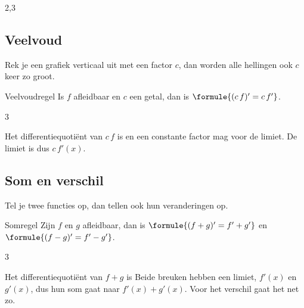 \begin{alleenvoor}{2,3}
\subsection{Veelvoud}

Rek je een grafiek verticaal uit met een factor $c$, dan worden alle hellingen ook $c$ keer zo groot.

\begin{theorie}
\begin{stelling}{Veelvoudregel}
Is $f$ afleidbaar en $c$ een getal, dan is \quad $\formule{(c\,f)' = c\,f'}$.
\end{stelling}
\begin{alleenvoor}{3}
\begin{bewijs}
Het differentiequotiënt van $c\,f$ is
en een constante factor mag voor de limiet. De limiet is dus $c\,f'(x)$.
\end{bewijs}
\end{alleenvoor}
\end{theorie}


\begin{oefeningen}
\end{oefeningen}

\subsection{Som en verschil}

Tel je twee functies op, dan tellen ook hun veranderingen op.

\begin{theorie}
\begin{stelling}{Somregel}
Zijn $f$ en $g$ afleidbaar, dan is \quad $\formule{(f + g)' = f' + g'}$ \quad en \quad $\formule{(f - g)' = f' - g'}$.
\end{stelling}
\begin{alleenvoor}{3}
\begin{bewijs}
Het differentiequotiënt van $f + g$ is
Beide breuken hebben een limiet, $f'(x)$ en $g'(x)$, dus hun som gaat naar $f'(x) + g'(x)$. Voor het verschil gaat het net zo.
\end{bewijs}
\end{alleenvoor}
\end{theorie}


\end{alleenvoor}
